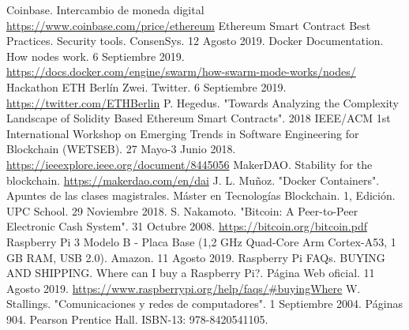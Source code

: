 \documentclass[12pt]{amsart}
\begin{document}
\begin{multicols}{2}
\begin{thebibliography}{9}
 Coinbase. Intercambio de moneda digital \href{https://www.coinbase.com/price/ethereum}{https://www.coinbase.com/price/ethereum}
 Ethereum Smart Contract Best Practices. Security tools. ConsenSys. 12 Agosto 2019.
 Docker Documentation. How nodes work. 6 Septiembre 2019.  \href{https://docs.docker.com/engine/swarm/how-swarm-mode-works/nodes/}{https://docs.docker.com/engine/swarm/how-swarm-mode-works/nodes/}
 Hackathon ETH Berlín Zwei. Twitter. 6 Septiembre 2019. \href{https://twitter.com/ETHBerlin}{https://twitter.com/ETHBerlin}
 P. Hegedus. "Towards Analyzing the Complexity Landscape of Solidity Based Ethereum Smart Contracts". 2018 IEEE/ACM 1st International Workshop on Emerging Trends in Software Engineering for Blockchain (WETSEB). 27 Mayo-3 Junio 2018. \href{https://ieeexplore.ieee.org/document/8445056}{https://ieeexplore.ieee.org/document/8445056}
 MakerDAO. Stability for the blockchain.  \href{https://makerdao.com/en/dai}{https://makerdao.com/en/dai}
 J. L. Muñoz. "Docker Containers". Apuntes de las clases magistrales. Máster en Tecnologías Blockchain. 1, Edición. UPC School. 29 Noviembre 2018.
 S. Nakamoto. "Bitcoin: A Peer-to-Peer Electronic Cash System". 31 Octubre 2008.  \href{https://bitcoin.org/bitcoin.pdf}{https://bitcoin.org/bitcoin.pdf}
 Raspberry Pi 3 Modelo B - Placa Base (1,2 GHz Quad-Core Arm Cortex-A53, 1 GB RAM, USB 2.0). Amazon. 11 Agosto 2019.
 Raspberry Pi FAQs. BUYING AND SHIPPING. Where can I buy a Raspberry Pi?. Página Web oficial. 11 Agosto 2019.  \href{https://www.raspberrypi.org/help/faqs/#buyingWhere}{https://www.raspberrypi.org/help/faqs/\#buyingWhere}
 W. Stallings. "Comunicaciones y redes de computadores". 1 Septiembre 2004. Páginas 904. Pearson Prentice Hall. ISBN-13: 978-8420541105.
\end{thebibliography}
\clearpage


\end{multicols}
\end{document}
